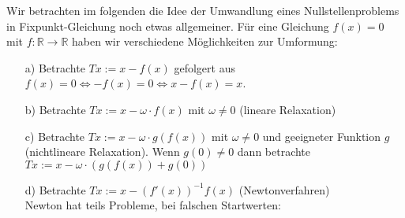 Wir betrachten im folgenden die Idee der Umwandlung eines Nullstellenproblems in Fixpunkt-Gleichung noch etwas 
allgemeiner. Für eine Gleichung $f(x)=0$ mit $f:\mathbb{R}\rightarrow\mathbb{R}$ haben wir verschiedene Möglichkeiten 
zur Umformung:\\
\begin{enumerate}
    \item[a)] Betrachte $Tx := x-f(x)$ gefolgert aus $f(x)=0\Leftrightarrow -f(x)=0 \Leftrightarrow x-f(x)=x$.
    \item[b)] Betrachte $Tx := x-\omega \cdot f(x)$ mit $\omega\neq 0$ (lineare Relaxation)
    \item[c)] Betrachte $Tx:=x-\omega \cdot g(f(x))$ mit $\omega \neq 0$ und geeigneter Funktion $g$ 
    (nichtlineare Relaxation). Wenn $g(0)\neq 0$ dann betrachte $Tx:=x-\omega\cdot(g(f(x))+g(0))$
    \newpage
    \item[d)] Betrachte $Tx:=x-(f'(x))^{-1} f(x)$ (Newtonverfahren) \\
    Newton hat teils Probleme, bei falschen Startwerten: \\
    \begin{center}
\end{center}
\end{enumerate}
